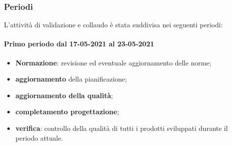 \subsubsection{Periodi}
L'attività di validazione e collaudo è stata suddivisa nei seguenti periodi:
\paragraph{Primo periodo dal 17-05-2021 al 23-05-2021}
\begin{itemize}
	\item \textbf{Normazione}: revisione ed eventuale aggiornamento delle norme;
	\item \textbf{aggiornamento} della pianificazione;
	\item \textbf{aggiornamento della qualità};
	\item \textbf{completamento progettazione};
	\item \textbf{verifica}: controllo della qualità di tutti i prodotti sviluppati durante il periodo attuale.
\end{itemize}


